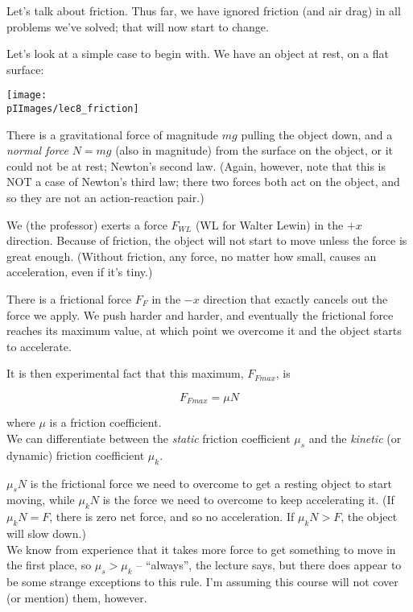 Let's talk about friction. Thus far, we have ignored friction (and air drag) in all problems we've solved; that will now start to change.

Let's look at a simple case to begin with. We have an object at rest, on a flat surface:

\begin{center}
\texttt{[image: \\pIImages/lec8\_friction]}
\end{center}

There is a gravitational force of magnitude $m g$ pulling the object down, and a \emph{normal force} $N = m g$ (also in magnitude) from the surface on the object, or it could not be at rest; Newton's second law. (Again, however, note that this is NOT a case of Newton's third law; there two forces both act on the object, and so they are not an action-reaction pair.)

We (the professor) exerts a force $F_{WL}$ (WL for Walter Lewin) in the $+x$ direction. Because of friction, the object will not start to move unless the force is great enough. (Without friction, any force, no matter how small, causes an acceleration, even if it's tiny.)

There is a frictional force $F_F$ in the $-x$ direction that exactly cancels out the force we apply. We push harder and harder, and eventually the frictional force reaches its maximum value, at which point we overcome it and the object starts to accelerate.

It is then experimental fact that this maximum, $F_{Fmax}$, is

\begin{equation}
F_{Fmax} = \mu N
\end{equation}

where $\mu$ is a friction coefficient.\\
We can differentiate between the \emph{static} friction coefficient $\mu_s$ and the \emph{kinetic} (or dynamic) friction coefficient $\mu_k$.

$\mu_s N$ is the frictional force we need to overcome to get a resting object to start moving, while $\mu_k N$ is the force we need to overcome to keep accelerating it. (If $\mu_k N = F$, there is zero net force, and so no acceleration. If $\mu_k N > F$, the object will slow down.)\\
We know from experience that it takes more force to get something to move in the first place, so $\mu_s > \mu_k$ -- ``always'', the lecture says, but there does appear to be some strange exceptions to this rule. I'm assuming this course will not cover (or mention) them, however.

